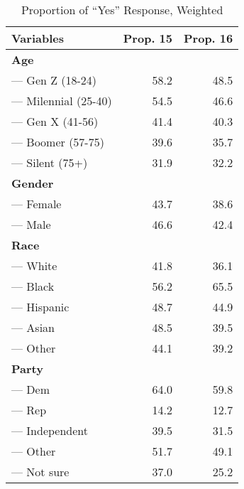 \begin{table}[ht]
\centering
\begin{tabular}{lrr}
  \toprule
{\textbf{Variables}} & {\textbf{Prop. 15}} & {\textbf{Prop. 16}} \\ 
  \midrule 
 \textbf{ Age } & \\
--- Gen Z (18-24) & 58.2 & 48.5 \\ 
  --- Milennial (25-40) & 54.5 & 46.6 \\ 
  --- Gen X (41-56) & 41.4 & 40.3 \\ 
  --- Boomer (57-75) & 39.6 & 35.7 \\ 
  --- Silent (75+) & 31.9 & 32.2 \\ 
   \midrule 
 \textbf{ Gender } & \\
--- Female & 43.7 & 38.6 \\ 
  --- Male & 46.6 & 42.4 \\ 
   \midrule 
 \textbf{ Race } & \\
--- White & 41.8 & 36.1 \\ 
  --- Black & 56.2 & 65.5 \\ 
  --- Hispanic & 48.7 & 44.9 \\ 
  --- Asian & 48.5 & 39.5 \\ 
  --- Other & 44.1 & 39.2 \\ 
   \midrule 
 \textbf{ Party } & \\
--- Dem & 64.0 & 59.8 \\ 
  --- Rep & 14.2 & 12.7 \\ 
  --- Independent & 39.5 & 31.5 \\ 
  --- Other & 51.7 & 49.1 \\ 
  --- Not sure & 37.0 & 25.2 \\ 
   \bottomrule
\end{tabular}
\caption{Proportion of ``Yes'' Response, Weighted} 
\label{tab:desc}
\end{table}

